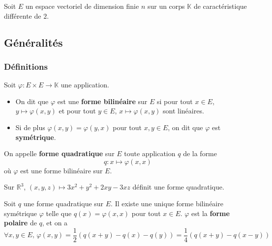 




  Soit $E$ un espace vectoriel de dimension finie $n$ sur un corps $\mathbb{K}$ de caractéristique différente de $2$.

  \subsection{Généralités}

  \subsubsection{Définitions}


  \begin{definition}
    Soit $\varphi : E \times E \rightarrow \mathbb{K}$ une application.
    \begin{itemize}
      \item On dit que $\varphi$ est une \textbf{forme bilinéaire} sur $E$ si pour tout $x \in E$, $y \mapsto \varphi(x, y)$ et pour tout $y \in E$, $x \mapsto \varphi(x, y)$ sont linéaires.
      \item Si de plus $\varphi(x, y) = \varphi(y, x)$ pour tout $x, y \in E$, on dit que $\varphi$ est \textbf{symétrique}.
    \end{itemize}
  \end{definition}

  \begin{definition}
    On appelle \textbf{forme quadratique} sur $E$ toute application $q$ de la forme
    \[ q : x \mapsto \varphi(x, x) \]
    où $\varphi$ est une forme bilinéaire sur $E$.
  \end{definition}

  \begin{example}
    \label{170-1}
    Sur $\mathbb{R}^3$, $(x, y, z) \mapsto 3x^2 + y^2 + 2xy - 3xz$ définit une forme quadratique.
  \end{example}

  \begin{proposition}
    Soit $q$ une forme quadratique sur $E$. Il existe une unique forme bilinéaire symétrique $\varphi$ telle que $q(x) = \varphi(x, x)$ pour tout $x \in E$. $\varphi$ est la \textbf{forme polaire} de $q$, et on a
    \[ \forall x, y \in E, \, \varphi(x, y) = \frac{1}{2} (q(x+y) - q(x) - q(y)) = \frac{1}{4} (q(x+y) - q(x-y))  \]
  \end{proposition}

